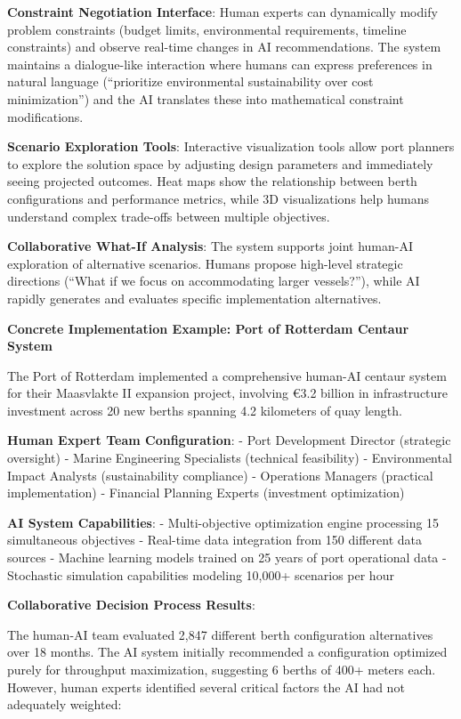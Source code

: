 \documentclass{article}
\begin{document}
\textbf{Constraint Negotiation Interface}: Human experts can dynamically modify problem constraints (budget limits, environmental requirements, timeline constraints) and observe real-time changes in AI recommendations. The system maintains a dialogue-like interaction where humans can express preferences in natural language (``prioritize environmental sustainability over cost minimization'') and the AI translates these into mathematical constraint modifications.

\textbf{Scenario Exploration Tools}: Interactive visualization tools allow port planners to explore the solution space by adjusting design parameters and immediately seeing projected outcomes. Heat maps show the relationship between berth configurations and performance metrics, while 3D visualizations help humans understand complex trade-offs between multiple objectives.

\textbf{Collaborative What-If Analysis}: The system supports joint human-AI exploration of alternative scenarios. Humans propose high-level strategic directions (``What if we focus on accommodating larger vessels?''), while AI rapidly generates and evaluates specific implementation alternatives.

\textbf{Concrete Implementation Example: Port of Rotterdam Centaur System}

The Port of Rotterdam implemented a comprehensive human-AI centaur system for their Maasvlakte II expansion project, involving \euro 3.2 billion in infrastructure investment across 20 new berths spanning 4.2 kilometers of quay length.

\textbf{Human Expert Team Configuration}:
- Port Development Director (strategic oversight)
- Marine Engineering Specialists (technical feasibility)
- Environmental Impact Analysts (sustainability compliance)
- Operations Managers (practical implementation)
- Financial Planning Experts (investment optimization)

\textbf{AI System Capabilities}:
- Multi-objective optimization engine processing 15 simultaneous objectives
- Real-time data integration from 150 different data sources
- Machine learning models trained on 25 years of port operational data
- Stochastic simulation capabilities modeling 10,000+ scenarios per hour

\textbf{Collaborative Decision Process Results}:

The human-AI team evaluated 2,847 different berth configuration alternatives over 18 months. The AI system initially recommended a configuration optimized purely for throughput maximization, suggesting 6 berths of 400+ meters each. However, human experts identified several critical factors the AI had not adequately weighted:
\end{document}
